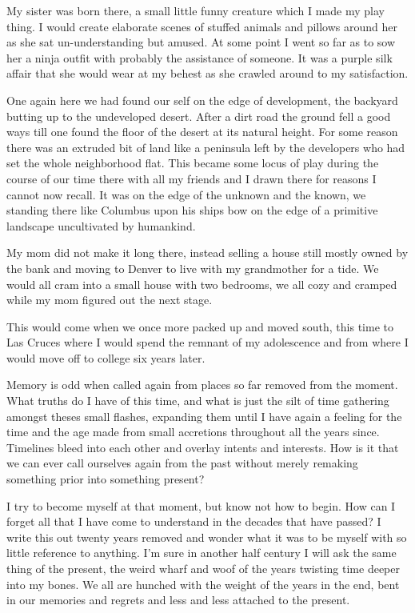 \documentclass[ebook, 10pt, openright, onecolumn]{memoir}
\begin{document}
My sister was born there, a small little funny creature which I made my play
thing.  I would create elaborate scenes of stuffed animals and pillows around
her as she sat un-understanding but amused.  At some point I went so far as to
sow her a ninja outfit with probably the assistance of someone.  It was a purple
silk affair that she would wear at my behest as she crawled around to my
satisfaction.

One again here we had found our self on the edge of development, the backyard
butting up to the undeveloped desert.  After a dirt road the ground fell a good
ways till one found the floor of the desert at its natural height.  For some
reason there was an extruded bit of land like a peninsula left by the developers
who had set the whole neighborhood flat.  This became some locus of play during
the course of our time there with all my friends and I drawn there for reasons I
cannot now recall.  It was on the edge of the unknown and the known, we standing
there like Columbus upon his ships bow on the edge of a primitive landscape
uncultivated by humankind.

My mom did not make it long there, instead selling a house still mostly owned by the
bank and moving to Denver to live with my grandmother for a tide.  We would
all cram into a small house with two bedrooms, we all cozy and cramped while my
mom figured out the next stage.

This would come when we once more packed up and moved south, this time to Las
Cruces where I would spend the remnant of my adolescence and from where I would
move off to college six years later.  

Memory is odd when called again from places so far removed from the moment.
What truths do I have of this time, and what is just the silt of time gathering
amongst theses small flashes, expanding them until I have again a feeling for
the time and the age made from  small accretions throughout all the years
since.  Timelines bleed into each other and overlay intents and interests.  How
is it that we can ever call ourselves again from the past without merely
remaking something prior into something present?

I try to become myself at that moment, but know not how to begin.  How can I
forget all that I have come to understand in the decades that have passed?  I
write this out twenty years removed and wonder what it was to be myself with so
little reference to anything.  I'm sure in another half century I will ask the
same thing of the present, the weird wharf and woof of the years twisting time
deeper into my bones.  We all are hunched with the weight of the years in the
end, bent in our memories and regrets and less and less attached to the present.
\end{document}
